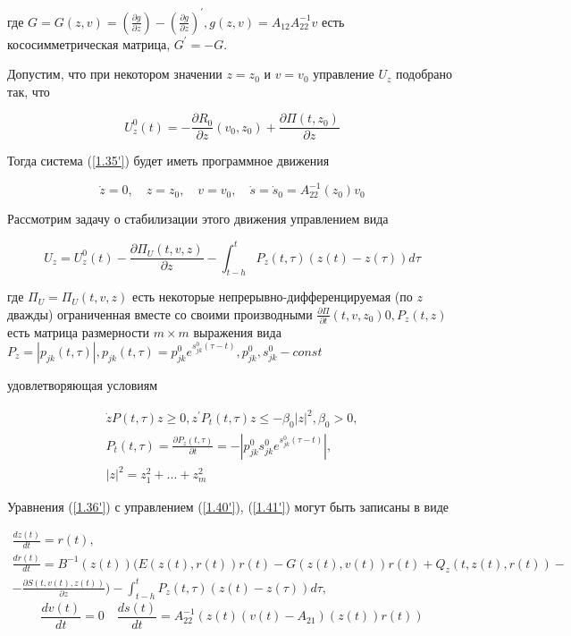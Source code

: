 где $G = G(z, v) = (\frac{\partial g}{\partial z}) - (\frac{\partial g}{\partial z})^{'}, g(z, v) = A_{12} A_{22}^{-1} v$ есть кососимметрическая матрица, $G^{'} = -G$.

Допустим, что при некотором значении $z = z_0$ и $v = v_0$ управление $U_z$ подобрано так, что 

\begin{equation} \label{1.38'}
U_z^0 (t) = - \frac{\partial R_0}{\partial z} (v_0, z_0) + \frac{\partial \Pi (t, z_0)}{\partial z}
\end{equation}

Тогда система (\ref{1.35'}) будет иметь программное движения 

\begin{equation} \label{1.39'}
\dot z = 0, \quad z = z_0, \quad v = v_0, \quad \dot s = \dot s_0 = A_{22}^{-1} (z_0) v_0
\end{equation}

Рассмотрим задачу о стабилизации этого движения управлением вида 

\begin{equation} \label{1.40'}
U_z = U_z^0 (t) - \frac{\partial \Pi_U (t, v, z)}{\partial z} - \int_{t - h}^{t} P_z (t, \tau) (z(t) - z(\tau)) d \tau
\end{equation}

где $\Pi_U = \Pi_U (t, v, z)$ есть некоторые непрерывно-дифференцируемая (по $z$ дважды) ограниченная вместе со своими производными $\frac{\partial \Pi}{\partial t} (t, v, z_0) 0 , P_z(t, z)$ есть матрица размерности $m \times m$ выражения вида $P_z = \left| p_{jk} (t, \tau) \right|, p_{jk} (t, \tau) = p_{jk}^0 e^{s_{jk}^0 (\tau - t)}, p_{jk}^0, s_{jk}^0 - const$

удовлетворяющая условиям

\begin{equation} \label{1.41'}
\begin{array}{c}
\dot z P(t, \tau) z \ge 0, z^{'} P_t (t, \tau) z \le - \beta_0 \left| z \right|^2, \beta_0 > 0,\\
P_t (t, \tau) = \frac{\partial P_z (t, \tau)}{\partial t} = - \left| p_{jk}^0 s_{jk}^0 e^{s_{jk}^0 (\tau - t)} \right|,\\
\left| z \right|^2 = z_1^2 + ... + z_m^2
\end{array}
\end{equation}

Уравнения (\ref{1.36'}) с управлением (\ref{1.40'}), (\ref{1.41'}) могут быть записаны в виде

\begin{equation} \label{1.42'}
\begin{array}{c}
\displaystyle \frac{d z (t)}{dt} = r(t),\\
\displaystyle \frac{d r(t)}{dt} = B^{-1} (z(t)) (E(z(t), r(t)) r(t) - G(z(t), v(t)) r(t) + Q_z (t, z(t), r(t)) -\\
\displaystyle - \frac{\partial S(t, v(t), z(t))}{\partial z}) - \int_{t - h}^{t} P_z (t, \tau) (z(t) - z(\tau)) d \tau,
\end{array}
\end{equation}
$$\frac{d v(t)}{dt} = 0 \quad \frac{d s(t)}{dt} = A_{22}^{-1} (z(t) (v(t) - A_{21}) (z(t)) r(t))$$

